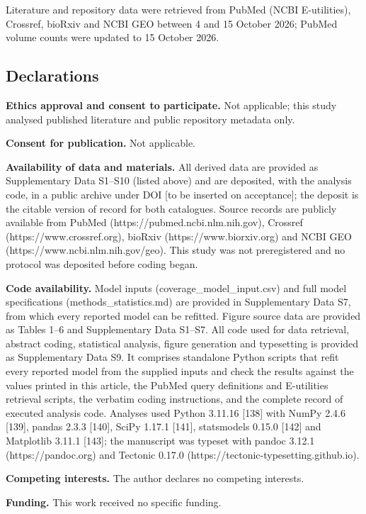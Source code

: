 \documentclass[11pt]{article}
\begin{document}
Literature and repository data were retrieved from PubMed (NCBI
E-utilities), Crossref, bioRxiv and NCBI GEO between 4 and 15 October
2026; PubMed volume counts were updated to 15 October 2026.

\subsection{Declarations}\label{declarations}

\textbf{Ethics approval and consent to participate.} Not applicable;
this study analysed published literature and public repository metadata
only.

\textbf{Consent for publication.} Not applicable.

\textbf{Availability of data and materials.} All derived data are
provided as Supplementary Data S1--S10 (listed above) and are deposited,
with the analysis code, in a public archive under DOI {[}to be inserted
on acceptance{]}; the deposit is the citable version of record for both
catalogues. Source records are publicly available from PubMed
(https://pubmed.ncbi.nlm.nih.gov), Crossref (https://www.crossref.org),
bioRxiv (https://www.biorxiv.org) and NCBI GEO
(https://www.ncbi.nlm.nih.gov/geo). This study was not preregistered and
no protocol was deposited before coding began.

\textbf{Code availability.} Model inputs (coverage\_model\_input.csv)
and full model specifications (methods\_statistics.md) are provided in
Supplementary Data S7, from which every reported model can be refitted.
Figure source data are provided as Tables 1--6 and Supplementary Data
S1--S7. All code used for data retrieval, abstract coding, statistical
analysis, figure generation and typesetting is provided as Supplementary
Data S9. It comprises standalone Python scripts that refit every
reported model from the supplied inputs and check the results against
the values printed in this article, the PubMed query definitions and
E-utilities retrieval scripts, the verbatim coding instructions, and the
complete record of executed analysis code. Analyses used Python 3.11.16
{[}138{]} with NumPy 2.4.6 {[}139{]}, pandas 2.3.3 {[}140{]}, SciPy
1.17.1 {[}141{]}, statsmodels 0.15.0 {[}142{]} and Matplotlib 3.11.1
{[}143{]}; the manuscript was typeset with pandoc 3.12.1
(https://pandoc.org) and Tectonic 0.17.0
(https://tectonic-typesetting.github.io).

\textbf{Competing interests.} The author declares no competing
interests.

\textbf{Funding.} This work received no specific funding.
\end{document}
